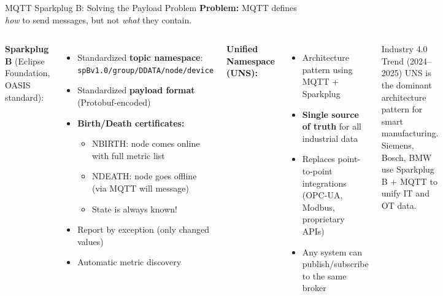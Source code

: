 \documentclass[aspectratio=169,11pt]{beamer}
\begin{document}
\begin{frame}{MQTT Sparkplug B: Solving the Payload Problem}
    \textbf{Problem:} MQTT defines \textit{how} to send messages, but not \textit{what} they contain.
    
    \vspace{0.2cm}
    \begin{columns}
        \textbf{Sparkplug B} (Eclipse Foundation, OASIS standard):
        \begin{itemize}
            \item Standardized \textbf{topic namespace}:\\
            \texttt{spBv1.0/group/DDATA/node/device}
            \item Standardized \textbf{payload format} (Protobuf-encoded)
            \item \textbf{Birth/Death certificates:}
            \begin{itemize}
                \item NBIRTH: node comes online with full metric list
                \item NDEATH: node goes offline (via MQTT will message)
                \item State is always known!
            \end{itemize}
            \item Report by exception (only changed values)
            \item Automatic metric discovery
        \end{itemize}
        
        \textbf{Unified Namespace (UNS):}
        \begin{itemize}
            \item Architecture pattern using MQTT + Sparkplug
            \item \textbf{Single source of truth} for all industrial data
            \item Replaces point-to-point integrations (OPC-UA, Modbus, proprietary APIs)
            \item Any system can publish/subscribe to the same broker
        \end{itemize}
        
        \vspace{0.1cm}
        \begin{exampleblock}{Industry 4.0 Trend (2024--2025)}
            UNS is the dominant architecture pattern for smart manufacturing. Siemens, Bosch, BMW use Sparkplug B + MQTT to unify IT and OT data.
        \end{exampleblock}
    \end{columns}
\end{frame}
\end{document}
